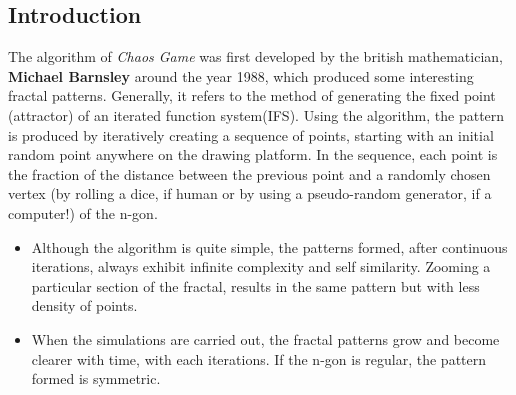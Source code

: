 \documentclass[a0,portrait]{a0poster}
\begin{document}
\begin{multicols}{3}
\section*{Introduction}
The algorithm of \textit{Chaos Game} was first developed by the british mathematician, \textbf{Michael Barnsley} around the year 1988, which produced some interesting fractal patterns. Generally, it refers to the method of generating the fixed point (attractor) of an iterated function system(IFS). Using the algorithm, the pattern is produced by iteratively creating a sequence of points, starting with an initial random point anywhere on the drawing platform. In the sequence, each point is the fraction of the distance between the previous point and a randomly chosen vertex (by rolling a dice, if human or by using a pseudo-random generator, if a computer!) of the n-gon.\\
\begin{itemize}
\item Although the algorithm is quite simple, the patterns formed, after continuous iterations, always exhibit infinite complexity and self similarity. Zooming a particular section of the fractal, results in the same pattern but with less density of points.\\
\item When the simulations are carried out, the fractal patterns grow and become clearer with time, with each iterations. If the n-gon is regular, the pattern formed is symmetric.
\end{itemize}

\color{Black} %


\end{multicols}
\end{document}

